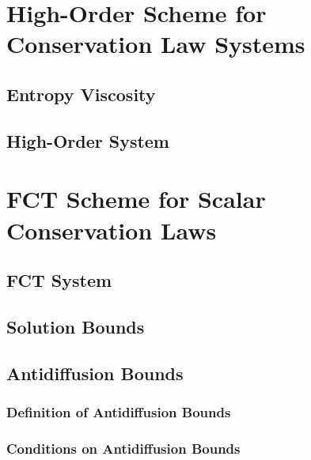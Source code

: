 \section{High-Order Scheme for Conservation Law Systems
  \label{sec:high_order_system}}  

\subsection{Entropy Viscosity\label{sec:entropy_viscosity_system}}
    
\subsection{High-Order System\label{sec:high_order_scheme_system}}
  
\section{FCT Scheme for Scalar Conservation Laws\label{sec:fct_scalar}}
\subsection{FCT System\label{sec:fct_scheme_scalar}}
  
\subsection{Solution Bounds\label{sec:fct_bounds}}
  
\subsection{Antidiffusion Bounds\label{sec:antidiffusion_bounds}}
  \subsubsection{Definition of Antidiffusion Bounds}
    
    
    
  \subsubsection{Conditions on Antidiffusion Bounds}
    
